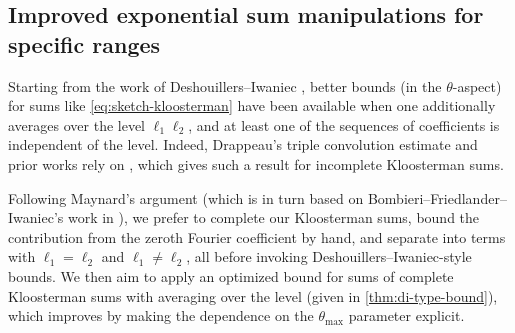 \documentclass[reqno,11pt]{amsart}
\theoremstyle{definition}
\theoremstyle{remark}
\numberwithin{equation}{section}
\begin{document}
\subsection{Improved exponential sum manipulations for specific ranges}

Starting from the work of Deshouillers--Iwaniec \cite{deshouillers1982kloosterman}, better bounds (in the $\theta$-aspect) for sums like \cref{eq:sketch-kloosterman} have been available when one additionally averages over the level $\ell_1\ell_2$, and at least one of the sequences of coefficients is independent of the level. Indeed, Drappeau's triple convolution estimate \cite{drappeau2015theoremes} and prior works rely on \cite[Theorem 12]{deshouillers1982kloosterman}, which gives such a result for incomplete Kloosterman sums.

Following Maynard's argument (which is in turn based on Bombieri--Friedlander--Iwaniec's work in \cite[\S 10]{bombieri1987primes2}), we prefer to complete our Kloosterman sums, bound the contribution from the zeroth Fourier coefficient by hand, and separate into terms with $\ell_1 = \ell_2$ and $\ell_1 \neq \ell_2$, all before invoking Deshouillers--Iwaniec-style bounds. We then aim to apply an optimized bound for sums of complete Kloosterman sums with averaging over the level (given in \cref{thm:di-type-bound}), which improves \cite[Theorem 11]{deshouillers1982kloosterman} by making the dependence on the $\theta_{\max}$ parameter explicit. 
\end{document}
